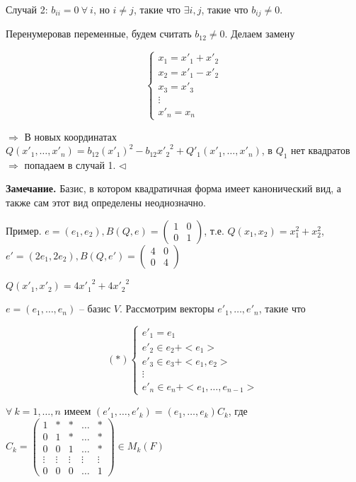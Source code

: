Случай 2: $b_{ii} = 0 \ \forall \ i$, но $i \neq j$, такие что $\exists i, j$, такие что $b_{ij} \neq 0$.

Перенумеровав переменные, будем считать $b_{12} \neq 0$. Делаем замену 

\[
\begin{cases}
		x_1 = x'_1 + x'_2 \\
		x_2 = x'_1 - x'_2 \\
        x_3 = x'_3 \\
        \vdots \\
        x'_n = x_n
	\end{cases}
\]

$\Rightarrow$ В новых координатах $Q(x'_1, \dots, x'_n) = b_{12} (x'_1)^2 - b_{12} {x'_2}^2 + Q'_1(x'_1, \dots, x'_n)$, в $Q_1$ нет квадратов $\Rightarrow$ попадаем в случай 1. $\lhd$

\vspace{\baselineskip}
\textbf{Замечание.} Базис, в котором квадратичная форма имеет канонический вид, а также сам этот вид определены неоднозначно.

\vspace{\baselineskip}
Пример. $e = (e_1, e_2), B(Q, e) = \begin{pmatrix} 1 & 0 \\ 0 & 1 \end{pmatrix}$, т.е. $Q(x_1, x_2) = x_1^2 + x_2^2$, $e' = (2e_1, 2e_2), B(Q, e') = \begin{pmatrix} 4 & 0 \\ 0 & 4 \end{pmatrix}$

$Q(x'_1, x'_2) = 4{x'_1}^2 + 4{x'_2}^2$

\vspace{\baselineskip}
$e = (e_1, \dots, e_n)$ -- базис $V$. Рассмотрим векторы $e'_1, \dots, e'_n$, такие что  

\[
(*) \begin{cases}
		e'_1 = e_1 \\
		e'_2 \in e_2 + <e_1> \\
        e'_3 \in e_3 + <e_1, e_2> \\
        \vdots \\
        e'_n \in e_n + <e_1, \dots, e_{n-1}>
	\end{cases}
\]  

$\forall \ k = 1, \dots, n$ имеем $(e'_1, \dots, e'_k) = (e_1, \dots, e_k) C_k$, где $C_k = \begin{pmatrix} 1 & * & * & \dots & * \\ 0 & 1 & * & \dots & * \\ 0 & 0 & 1 & \dots & * \\ \vdots & \vdots & \vdots & \vdots & \vdots \\ 0 & 0 & 0 & \dots & 1 \end{pmatrix} \in M_k(F)$

